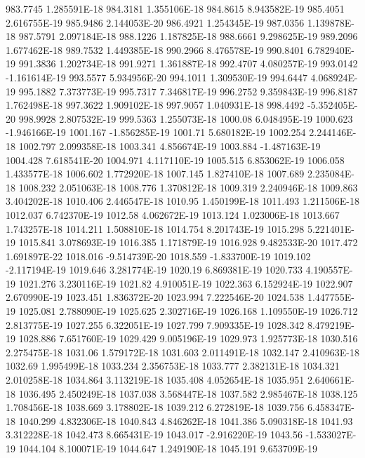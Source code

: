 983.7745  1.285591E-18
984.3181  1.355106E-18
984.8615  8.943582E-19
985.4051  2.616755E-19
985.9486  2.144053E-20
986.4921  1.254345E-19
987.0356  1.139878E-18
987.5791  2.097184E-18
988.1226  1.187825E-18
988.6661  9.298625E-19
989.2096  1.677462E-18
989.7532  1.449385E-18
990.2966  8.476578E-19
990.8401  6.782940E-19
991.3836  1.202734E-18
991.9271  1.361887E-18
992.4707  4.080257E-19
993.0142  -1.161614E-19
993.5577  5.934956E-20
994.1011  1.309530E-19
994.6447  4.068924E-19
995.1882  7.373773E-19
995.7317  7.346817E-19
996.2752  9.359843E-19
996.8187  1.762498E-18
997.3622  1.909102E-18
997.9057  1.040931E-18
998.4492  -5.352405E-20
998.9928  2.807532E-19
999.5363  1.255073E-18
1000.08  6.048495E-19
1000.623  -1.946166E-19
1001.167  -1.856285E-19
1001.71  5.680182E-19
1002.254  2.244146E-18
1002.797  2.099358E-18
1003.341  4.856674E-19
1003.884  -1.487163E-19
1004.428  7.618541E-20
1004.971  4.117110E-19
1005.515  6.853062E-19
1006.058  1.433577E-18
1006.602  1.772920E-18
1007.145  1.827410E-18
1007.689  2.235084E-18
1008.232  2.051063E-18
1008.776  1.370812E-18
1009.319  2.240946E-18
1009.863  3.404202E-18
1010.406  2.446547E-18
1010.95  1.450199E-18
1011.493  1.211506E-18
1012.037  6.742370E-19
1012.58  4.062672E-19
1013.124  1.023006E-18
1013.667  1.743257E-18
1014.211  1.508810E-18
1014.754  8.201743E-19
1015.298  5.221401E-19
1015.841  3.078693E-19
1016.385  1.171879E-19
1016.928  9.482533E-20
1017.472  1.691897E-22
1018.016  -9.514739E-20
1018.559  -1.833700E-19
1019.102  -2.117194E-19
1019.646  3.281774E-19
1020.19  6.869381E-19
1020.733  4.190557E-19
1021.276  3.230116E-19
1021.82  4.910051E-19
1022.363  6.152924E-19
1022.907  2.670990E-19
1023.451  1.836372E-20
1023.994  7.222546E-20
1024.538  1.447755E-19
1025.081  2.788090E-19
1025.625  2.302716E-19
1026.168  1.109550E-19
1026.712  2.813775E-19
1027.255  6.322051E-19
1027.799  7.909335E-19
1028.342  8.479219E-19
1028.886  7.651760E-19
1029.429  9.005196E-19
1029.973  1.925773E-18
1030.516  2.275475E-18
1031.06  1.579172E-18
1031.603  2.011491E-18
1032.147  2.410963E-18
1032.69  1.995499E-18
1033.234  2.356753E-18
1033.777  2.382131E-18
1034.321  2.010258E-18
1034.864  3.113219E-18
1035.408  4.052654E-18
1035.951  2.640661E-18
1036.495  2.450249E-18
1037.038  3.568447E-18
1037.582  2.985467E-18
1038.125  1.708456E-18
1038.669  3.178802E-18
1039.212  6.272819E-18
1039.756  6.458347E-18
1040.299  4.832306E-18
1040.843  4.846262E-18
1041.386  5.090318E-18
1041.93  3.312228E-18
1042.473  8.665431E-19
1043.017  -2.916220E-19
1043.56  -1.533027E-19
1044.104  8.100071E-19
1044.647  1.249190E-18
1045.191  9.653709E-19
